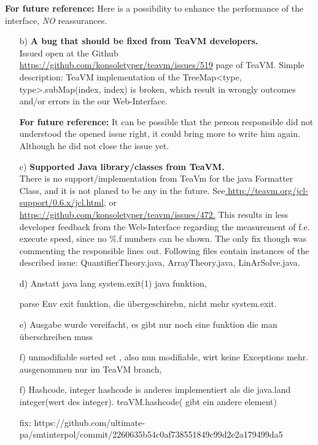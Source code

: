 \documentclass[]{article}
\begin{document}
\textbf{For future reference:} Here is a possibility to enhance the performance of the interface, \textit{NO} reassurances.   

\begin{itemize}


\item[b)]  \textbf{A bug that should be fixed from TeaVM developers.} \\ Issued open at the Github \href{https://github.com/konsoletyper/teavm/issues/519}{https://github.com/konsoletyper/teavm/issues/519} page of TeaVM. Simple description: TeaVM implementation of the TreeMap<type, type>.subMap(index, index) is broken, which result in wrongly outcomes and/or errors in the our Web-Interface. 

\textbf{For future reference:} It can be possible that the person responsible did not understood the opened issue right, it could bring more to write him again. Although he did not close the issue yet.

\item[c)] \textbf{Supported Java library/classes from TeaVM.} \\ There is no support/implementation from TeaVm for the java Formatter Class, and it is not planed to be any in the future. See\href{http://teavm.org/jcl-support/0.6.x/jcl.html}{ http://teavm.org/jcl-support/0.6.x/jcl.html}, or\href{https://github.com/konsoletyper/teavm/issues/472}{ https://github.com/konsoletyper/teavm/issues/472.} This results in less developer feedback from the Web-Interface regarding the measurement of f.e. execute speed, since no \%.f numbers can be shown. The only fix though was commenting the responsible lines out.
Following files contain instances of the described issue: QuantifierTheory.java, ArrayTheory.java, LinArSolve.java.

\item[d)] Anstatt java lang system.exit(1) java funktion,

parse Env exit funktion, die übergeschirebn, nicht mehr system.exit.

\item[e)] Ausgabe wurde vereifacht, es gibt nur noch eine funktion die man überschreiben muss

\item[f)] unmodifiable sorted set , also nun modifiable, wirt keine Exceptions mehr. ausgenommen nur im TeaVM branch, 

\item[f)] Hashcode, integer hashcode is anderes implementiert als die java.land integer(wert des integer). teaVM.hashcode( gibt ein andere element)

fix: https://github.com/ultimate-pa/smtinterpol/commit/2260635b54c0af738551849c99d2e2a179499da5


\end{itemize}
\end{document}
